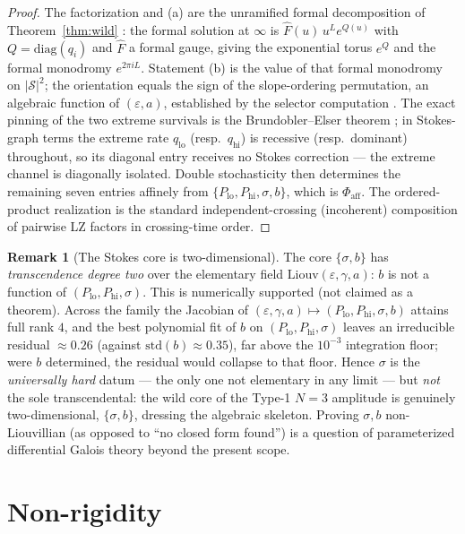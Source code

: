 \documentclass[11pt]{article}
\theoremstyle{definition}
\newtheorem{remark}{Remark}
\newcommand{\eps}{\varepsilon}
\newcommand{\diag}{\mathrm{diag}}
\newcommand{\Scat}{\mathcal{S}}
\begin{document}
\begin{proof}
The factorization and (a) are the unramified formal decomposition of Theorem~\ref{thm:wild}
\cite{Wasow,JMU}: the formal solution at $\infty$ is $\hat F(u)\,u^{L}e^{Q(u)}$ with $Q=\diag(q_i)$ and $\hat
F$ a formal gauge, giving the exponential torus $e^{Q}$ and the formal monodromy $e^{2\pi i L}$. Statement (b)
is the value of that formal monodromy on $|\Scat|^2$; the orientation equals the sign of the slope-ordering
permutation, an algebraic function of $(\eps,a)$, established by the selector computation \cite{OWY}. The
exact pinning of the two extreme survivals is the Brundobler--Elser theorem \cite{BE}; in Stokes-graph terms
the extreme rate $q_{\mathrm{lo}}$ (resp.\ $q_{\mathrm{hi}}$) is recessive (resp.\ dominant) throughout, so
its diagonal entry receives no Stokes correction --- the extreme channel is diagonally isolated. Double
stochasticity then determines the remaining seven entries affinely from
$\{P_{\mathrm{lo}},P_{\mathrm{hi}},\sigma,b\}$, which is $\Phi_{\mathrm{aff}}$. The ordered-product
realization is the standard independent-crossing (incoherent) composition of pairwise LZ factors in
crossing-time order.
\end{proof}

\begin{remark}[The Stokes core is two-dimensional]\label{rem:trdeg}
The core $\{\sigma,b\}$ has \emph{transcendence degree two} over the elementary field
$\mathrm{Liouv}(\eps,\gamma,a)$: $b$ is not a function of $(P_{\mathrm{lo}},P_{\mathrm{hi}},\sigma)$. This is
numerically supported (not claimed as a theorem). Across the family the Jacobian of
$(\eps,\gamma,a)\mapsto(P_{\mathrm{lo}},P_{\mathrm{hi}},\sigma,b)$ attains full rank $4$, and the best
polynomial fit of $b$ on $(P_{\mathrm{lo}},P_{\mathrm{hi}},\sigma)$ leaves an irreducible residual
$\approx 0.26$ (against $\mathrm{std}(b)\approx 0.35$), far above the $10^{-3}$ integration floor; were $b$
determined, the residual would collapse to that floor. Hence $\sigma$ is the \emph{universally hard} datum ---
the only one not elementary in any limit --- but \emph{not} the sole transcendental: the wild core of the
Type-1 $N{=}3$ amplitude is genuinely two-dimensional, $\{\sigma,b\}$, dressing the algebraic skeleton.
Proving $\sigma,b$ non-Liouvillian (as opposed to ``no closed form found'') is a question of parameterized
differential Galois theory beyond the present scope.
\end{remark}

\section{Non-rigidity}\label{sec:nonrigid}
\end{document}
